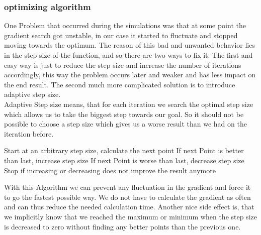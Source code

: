 \subsubsection{optimizing algorithm}
One Problem that occurred during the simulations was that at some point the gradient search got unstable, in our case it started to fluctuate and stopped moving towards the optimum. The reason of this bad and unwanted behavior lies in the step size of the function, and so there are two ways to fix it. The first and easy way is just to reduce the step size and increase the number of iterations accordingly, this way the problem occurs later and weaker and has less impact on the end result. The second much more complicated solution is to introduce adaptive step size.\\
Adaptive Step size means, that for each iteration we search the optimal step size which allows us to take the biggest step towards our goal. So it should not be possible to choose a step size which gives us a worse result than we had on the iteration before.
\begin{algorithm}
	Start at an arbitrary step size, calculate the next point
	If next Point is better than last, increase step size
	If next Point is worse than last, decrease step size
	Stop if increasing or decreasing does not improve the result anymore
\end{algorithm}
With this Algorithm we can prevent any fluctuation in the gradient and force it to go the fastest possible way. We do not have to calculate the gradient as often and can thus reduce the needed calculation time. Another nice side effect is, that we implicitly know that we reached the maximum or minimum when the step size is decreased to zero without finding any better points than the previous one.

